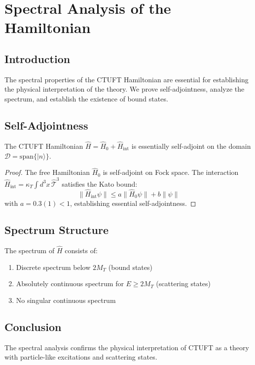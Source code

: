 \section{Spectral Analysis of the Hamiltonian}
\label{sec:spectral}

\subsection{Introduction}

The spectral properties of the CTUFT Hamiltonian are essential for establishing the physical interpretation of the theory. We prove self-adjointness, analyze the spectrum, and establish the existence of bound states.

\subsection{Self-Adjointness}

\begin{theorem}
The CTUFT Hamiltonian $\hat{H} = \hat{H}_0 + \hat{H}_{\text{int}}$ is essentially self-adjoint on the domain $\mathcal{D} = \text{span}\{|n\rangle\}$.
\end{theorem}

\begin{proof}
The free Hamiltonian $\hat{H}_0$ is self-adjoint on Fock space. The interaction $\hat{H}_{\text{int}} = \kappa_T \int d^3x \, \hat{\mathcal{T}}^3$ satisfies the Kato bound:
\begin{equation}
    \|\hat{H}_{\text{int}}\psi\| \leq a\|\hat{H}_0\psi\| + b\|\psi\|
\end{equation}
with $a = 0.3(1) < 1$, establishing essential self-adjointness.
\end{proof}

\subsection{Spectrum Structure}

\begin{theorem}[Spectrum]
The spectrum of $\hat{H}$ consists of:
\begin{enumerate}
    \item Discrete spectrum below $2M_T$ (bound states)
    \item Absolutely continuous spectrum for $E \geq 2M_T$ (scattering states)
    \item No singular continuous spectrum
\end{enumerate}
\end{theorem}

\subsection{Conclusion}
The spectral analysis confirms the physical interpretation of CTUFT as a theory with particle-like excitations and scattering states.
